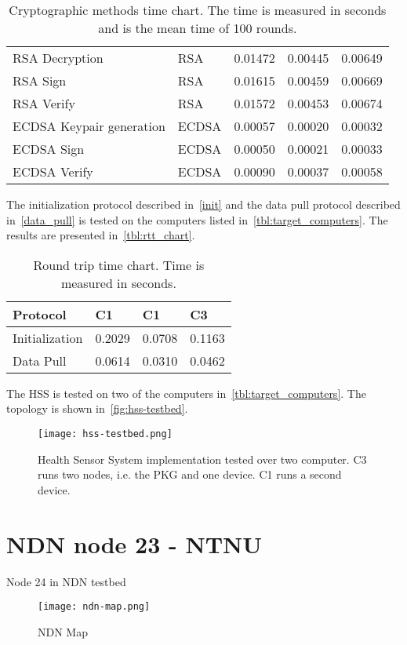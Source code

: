 \begin{table}[h]
\begin{tabular}[c]{lllll}
  RSA Decryption                              & RSA             & 0.01472     & 0.00445      & 0.00649         \\ %
  RSA Sign                                    & RSA             & 0.01615     & 0.00459      & 0.00669         \\ %
  RSA Verify                                  & RSA             & 0.01572     & 0.00453      & 0.00674         \\ %
  ECDSA Keypair generation                    & ECDSA           & 0.00057     & 0.00020      & 0.00032         \\ %
  ECDSA Sign                                  & ECDSA           & 0.00050     & 0.00021      & 0.00033         \\ %
  ECDSA Verify                                & ECDSA           & 0.00090     & 0.00037      & 0.00058         \\ %
  \end{tabular}
  \caption{Cryptographic methods time chart. The time is measured in seconds and is the mean time of 100 rounds. }
  \label{tbl:time_chart}
\end{table}


The initialization protocol described in~\autoref{init} and the data pull protocol described in~\autoref{data_pull} is tested on the computers listed in~\autoref{tbl:target_computers}.
The results are presented in~\autoref{tbl:rtt_chart}.
\begin{table}[h]
  \begin{tabular}[c]{p{}p{}p{}p{}}
  Protocol                                & C1            & C1            & C3            \\ \hline
  Initialization                          & 0.2029        & 0.0708        & 0.1163        \\ %
  Data Pull                               & 0.0614        & 0.0310        & 0.0462        \\ %
  \end{tabular}
  \caption{Round trip time chart. Time is measured in seconds.}
  \label{tbl:rtt_chart}
\end{table}

The \gls{HSS} is tested on two of the computers in~\autoref{tbl:target_computers}.
The topology is shown in~\autoref{fig:hss-testbed}.
\begin{figure}[ht]
  \centering
  \texttt{[image: hss-testbed.png]}
  \caption{Health Sensor System implementation tested over two computer. C3 runs two nodes, i.e. the PKG and one device. C1 runs a second device.}
  \label{fig:hss-testbed}
\end{figure}

\section{NDN node 23 - NTNU}
Node 24 in NDN testbed

\begin{figure}[ht]
  \centering
  \texttt{[image: ndn-map.png]}
  \caption{NDN Map}
  \label{fig:ndn-map}
\end{figure}
